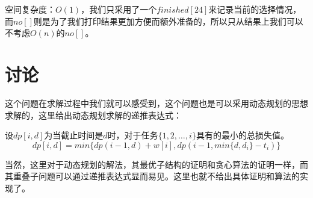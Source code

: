 \documentclass[11pt]{ctexart}
\begin{document}
空间复杂度：$O(1)$，我们只采用了一个$finished[24]$来记录当前的选择情况，而$no[]$则是为了我们打印结果更加方便而额外准备的，所以只从结果上我们可以不考虑$O(n)$的$no[]$。

\section{讨论}

这个问题在求解过程中我们就可以感受到，这个问题也是可以采用动态规划的思想求解的，这里给出动态规划求解的递推表达式：

设$dp[i,d]$为当截止时间是$d$时，对于任务$\{1,2,\dots,i\}$具有的最小的总损失值。
$$
dp[i,d] = min\{dp(i-1,d)+w[i],dp(i-1,min\{d,d_i\}-t_i)\}
$$

当然，这里对于动态规划的解法，其最优子结构的证明和贪心算法的证明一样，而其重叠子问题可以通过递推表达式显而易见。这里也就不给出具体证明和算法的实现了。
\end{document}
